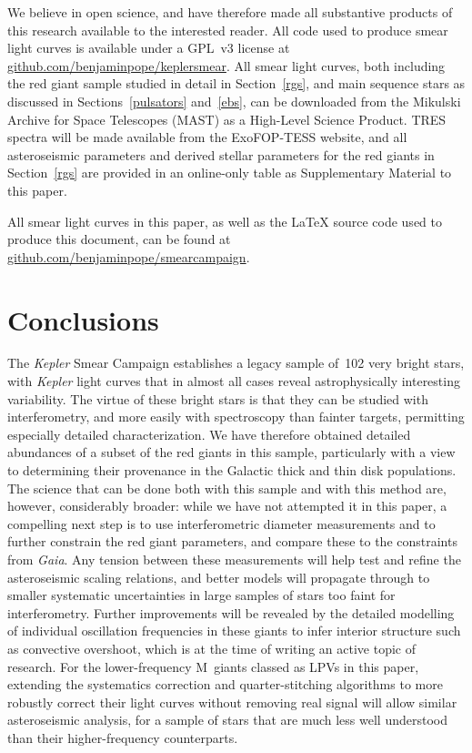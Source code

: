 \documentclass[a4paper,fleqn,usenatbib]{mnras}
\newcommand{\kepler}{\emph{Kepler}\xspace}
\newcommand{\gaia}{\emph{Gaia}\xspace}
\begin{document}
We believe in open science, and have therefore made all substantive products of this research available to the interested reader. All code used to produce smear light curves is available under a GPL~v3 license at \url{github.com/benjaminpope/keplersmear}. All smear light curves, both including the red giant sample studied in detail in Section~\ref{rgs}, and main sequence stars as discussed in Sections~\ref{pulsators} and~\ref{ebs}, can be downloaded from the Mikulski Archive for Space Telescopes (MAST) as a High-Level Science Product. TRES spectra will be made available from the ExoFOP-TESS website, and all asteroseismic parameters and derived stellar parameters for the red giants in Section~\ref{rgs} are provided in an online-only table as Supplementary Material to this paper.

All smear light curves in this paper, as well as the \LaTeX{} source code used to produce this document, can be found
at \url{github.com/benjaminpope/smearcampaign}.


\section{Conclusions}
\label{conclusions}

The \kepler Smear Campaign establishes a legacy sample of~102 very bright stars, with \kepler light curves that in almost all cases reveal astrophysically interesting variability. The virtue of these bright stars is that they can be studied with interferometry, and more easily with spectroscopy than fainter targets, permitting especially detailed characterization. We have therefore obtained detailed abundances of a subset of the red giants in this sample, particularly with a view to determining their provenance in the Galactic thick and thin disk populations. The science that can be done both with this sample and with this method are, however, considerably broader: while we have not attempted it in this paper, a compelling next step is to use interferometric diameter measurements and to further constrain the red giant parameters, and compare these to the constraints from \gaia. Any tension between these measurements will help test and refine the asteroseismic scaling relations, and better models will propagate through to smaller systematic uncertainties in large samples of stars too faint for interferometry. Further improvements will be revealed by the detailed modelling of individual oscillation frequencies in these giants to infer interior structure such as convective overshoot, which is at the time of writing an active topic of research. For the lower-frequency M~giants classed as LPVs in this paper, extending the systematics correction and quarter-stitching algorithms to more robustly correct their light curves without removing real signal will allow similar asteroseismic analysis, for a sample of stars that are much less well understood than their higher-frequency counterparts. 
\end{document}
